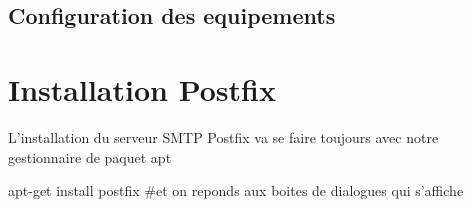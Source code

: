 \documentclass[a4paper,12pt,french]{report} %
\begin{document}
\subsection{Configuration des equipements}

\section{Installation Postfix}
L'installation du serveur SMTP Postfix va se faire toujours avec notre gestionnaire de paquet apt
\begin{exempleConsole}
apt-get install postfix #et on reponds aux boites de dialogues qui s'affiche
\end{exempleConsole}
\end{document}
